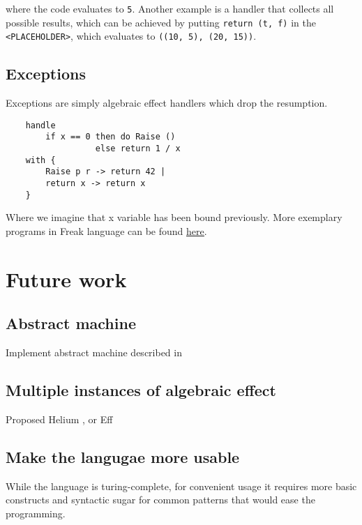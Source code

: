 \documentclass{article}
\theoremstyle{definition}
\theoremstyle{lemma}
\theoremstyle{observation}
\theoremstyle{theorem}
\begin{document}
    where the code evaluates to \verb!5!. Another example is a handler that
    collects all possible results, which can be achieved by putting
    \verb!return (t, f)! in the \verb!<PLACEHOLDER>!, which evaluates to \verb!((10, 5), (20, 15))!.

    \subsection{Exceptions}

    Exceptions are simply algebraic effect handlers which drop the resumption.

    \begin{verbatim}
    handle
        if x == 0 then do Raise ()
                  else return 1 / x
    with {
        Raise p r -> return 42 |
        return x -> return x
    }
    \end{verbatim}

    Where we imagine that x variable has been bound previously. More exemplary
    programs in Freak language can be found \href{https://github.com/Tomatosoup97/freak/tree/master/src/programs}{\underline{here}}.

\section{Future work}

    \subsection{Abstract machine}

    Implement abstract machine described in \cite{liberating-effects}

    \subsection{Multiple instances of algebraic effect}

    Proposed Helium \cite{binders-labels}, or Eff \cite{eff}

    \subsection{Make the langugae more usable}

    While the language is turing-complete, for convenient usage it
    requires more basic constructs and syntactic sugar for common patterns
    that would ease the programming.
\end{document}
